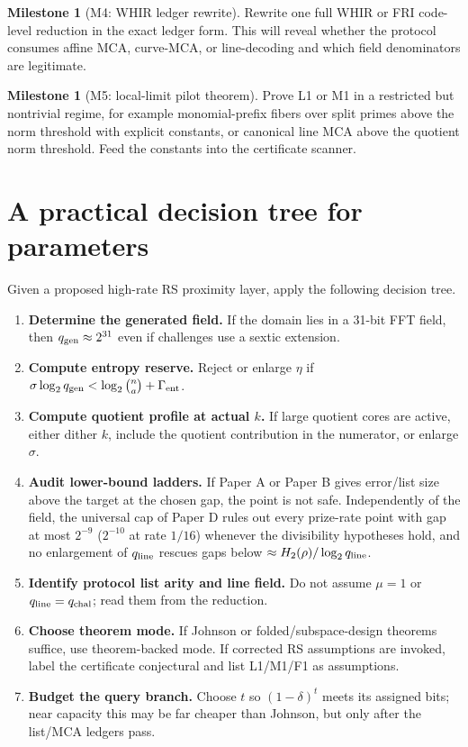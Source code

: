 \documentclass[11pt]{article}
\theoremstyle{definition}
\newtheorem{milestone}[theorem]{Milestone}
\theoremstyle{remark}
\newcommand{\qgen}{q_{\rm gen}}
\newcommand{\qline}{q_{\rm line}}
\newcommand{\qchal}{q_{\rm chal}}
\newcommand{\paperA}{Paper A}
\newcommand{\paperB}{Paper B}
\newcommand{\paperD}{Paper D}
\begin{document}
\begin{milestone}[M4: WHIR ledger rewrite]
Rewrite one full WHIR \cite{ACFY25} or FRI \cite{FRI} code-level reduction in the exact ledger form.  This will reveal whether the protocol consumes affine MCA, curve-MCA, or line-decoding and which field denominators are legitimate.
\end{milestone}

\begin{milestone}[M5: local-limit pilot theorem]
Prove L1 or M1 in a restricted but nontrivial regime, for example monomial-prefix fibers over split primes above the norm threshold with explicit constants, or canonical line MCA above the quotient norm threshold.  Feed the constants into the certificate scanner.
\end{milestone}

\section{A practical decision tree for parameters}

Given a proposed high-rate RS proximity layer, apply the following decision tree.

\begin{enumerate}[leftmargin=2.2em]
\item \textbf{Determine the generated field.}  If the domain lies in a 31-bit FFT field, then $\qgen\approx 2^{31}$ even if challenges use a sextic extension.
\item \textbf{Compute entropy reserve.}  Reject or enlarge $\eta$ if $\sigma\log_2\qgen<\log_2\binom n a+\Gamma_{\rm ent}$.
\item \textbf{Compute quotient profile at actual $k$.}  If large quotient cores are active, either dither $k$, include the quotient contribution in the numerator, or enlarge $\sigma$.
\item \textbf{Audit lower-bound ladders.}  If \paperA{} or \paperB{} gives error/list size above the target at the chosen gap, the point is not safe.  Independently of the field, the universal cap of \paperD{} rules out every prize-rate point with gap at most $2^{-9}$ ($2^{-10}$ at rate $1/16$) whenever the divisibility hypotheses hold, and no enlargement of $\qline$ rescues gaps below $\approx H_2(\rho)/\log_2\qline$.
\item \textbf{Identify protocol list arity and line field.}  Do not assume $\mu=1$ or $\qline=\qchal$; read them from the reduction.
\item \textbf{Choose theorem mode.}  If Johnson or folded/subspace-design theorems suffice, use theorem-backed mode.  If corrected RS assumptions are invoked, label the certificate conjectural and list L1/M1/F1 as assumptions.
\item \textbf{Budget the query branch.}  Choose $t$ so $(1-\delta)^t$ meets its assigned bits; near capacity this may be far cheaper than Johnson, but only after the list/MCA ledgers pass.
\end{enumerate}
\end{document}
